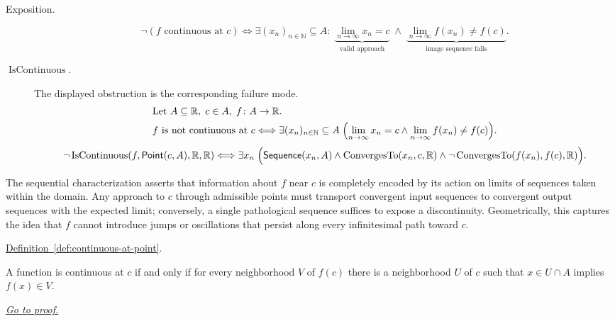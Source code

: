 \begin{remark*}
\begin{description}
  \item[Exposition.]
\[
\neg(\text{$f$ continuous at $c$}) \Longleftrightarrow
\exists (x_n)_{n\in\mathbb{N}} \subseteq A :\;
\underbrace{\lim_{n\to\infty} x_n = c}_{\text{valid approach}}
\;\land\;
\underbrace{\lim_{n\to\infty} f(x_n) \ne f(c)}_{\text{image sequence fails}}.
\]


  \item[\(\operatorname{IsContinuous}.\)]
  The displayed obstruction is the corresponding failure mode.
  \[
\begin{aligned}
&\text{Let } A \subseteq \mathbb{R},\; c \in A,\; f \colon A \to \mathbb{R}.\\
&f \text{ is not continuous at } c \Longleftrightarrow
\exists (x_n)_{n\in\mathbb{N}} \subseteq A\;
\Bigl(\lim_{n\to\infty} x_n = c \land \lim_{n\to\infty} f(x_n) \ne f(c)\Bigr).
\end{aligned}
  \]
  \[
\neg\operatorname{IsContinuous}(f,\mathsf{Point}(c,A),\mathbb R,\mathbb R)
\Longleftrightarrow
\exists x_n\;
\Bigl(\mathsf{Sequence}(x_n, A)
\land \operatorname{ConvergesTo}(x_n,c,\mathbb R)
\land \neg\operatorname{ConvergesTo}(f(x_n),f(c),\mathbb R)\Bigr).
  \]
\end{description}
\end{remark*}

\begin{remark*}[Interpretation]
The sequential characterization asserts that information about $f$ near $c$ is completely encoded by its action on limits of sequences taken within the domain. Any approach to $c$ through admissible points must transport convergent input sequences to convergent output sequences with the expected limit; conversely, a single pathological sequence suffices to expose a discontinuity. Geometrically, this captures the idea that $f$ cannot introduce jumps or oscillations that persist along every infinitesimal path toward $c$.
\end{remark*}

\begin{dependencies}
\hyperref[def:continuous-at-point]{Definition~\ref*{def:continuous-at-point}}.
\end{dependencies}

\begin{theorem}
\label{thm:continuous-at-point-iff-nbhd}
A function is continuous at $c$ if and only if for every neighborhood $V$ of $f(c)$ there is a neighborhood $U$ of $c$ such that $x\in U\cap A$ implies $f(x)\in V$.

\smallskip
\noindent
\hyperref[prf:continuous-at-point-iff-nbhd]{\textit{Go to proof.}}
\end{theorem}

